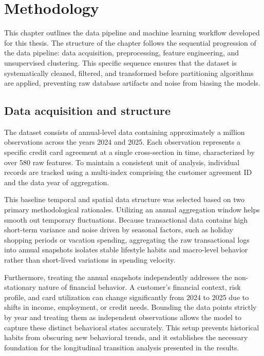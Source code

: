 \chapter{Methodology}
\label{chap:Methodology}

This chapter outlines the data pipeline and machine learning workflow developed for this thesis. The structure of the chapter follows the sequential progression of the data pipeline: data acquisition, preprocessing, feature engineering, and unsupervised clustering. This specific sequence ensures that the dataset is systematically cleaned, filtered, and transformed before partitioning algorithms are applied, preventing raw database artifacts and noise from biasing the models.

    \section{Data acquisition and structure}
    \label{sec:data_acquisition}
    The dataset consists of annual-level data containing approximately a million observations across the years 2024 and 2025. Each observation represents a specific credit card agreement at a single cross-section in time, characterized by over 580 raw features. To maintain a consistent unit of analysis, individual records are tracked using a multi-index comprising the customer agreement ID and the data year of aggregation. 
    
    This baseline temporal and spatial data structure was selected based on two primary methodological rationales. Utilizing an annual aggregation window helps smooth out temporary fluctuations. Because transactional data contains high short-term variance and noise driven by seasonal factors, such as holiday shopping periods or vacation spending, aggregating the raw transactional logs into annual snapshots isolates stable lifestyle habits and macro-level behavior rather than short-lived variations in spending velocity. 
    
    Furthermore, treating the annual snapshots independently addresses the non-stationary nature of financial behavior. A customer's financial context, risk profile, and card utilization can change significantly from 2024 to 2025 due to shifts in income, employment, or credit needs. Bounding the data points strictly by year and treating them as independent observations allows the model to capture these distinct behavioral states accurately. This setup prevents historical habits from obscuring new behavioral trends, and it establishes the necessary foundation for the longitudinal transition analysis presented in the results.
    
